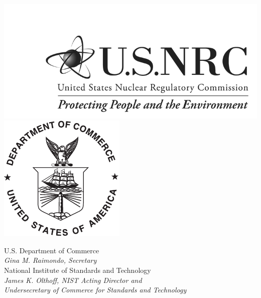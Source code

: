\documentclass[12pt]{article}
\begin{document}
\begin{titlepage}
\begin{flushright}
\includegraphics[width=0.4\linewidth]{../FIGURES/NRC_logo}  \hspace{0.5in}
\includegraphics[width=0.18\linewidth]{../FIGURES/DoC-logo}\\
\vfill



\footnotesize U.S. Department of Commerce\\
\textit{Gina M. Raimondo, Secretary}\\
\vspace{10pt}
National Institute of Standards and Technology\\
\textit{James K. Olthoff, NIST Acting Director and \\ Undersecretary of Commerce for Standards and Technology}
\end{flushright}
\end{titlepage}
\end{document}
